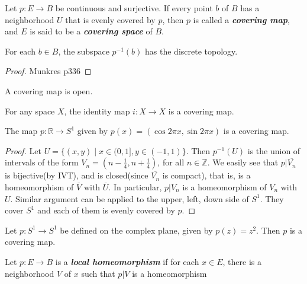 \begin{mydefinition}
Let $p:E\to B$ be continuous and surjective. If every point $b$ of $B$ has a neighborhood $U$ that is evenly covered by $p$, then $p$ is called a \textbf{\emph{covering map}}, and $E$ is said to be a \textbf{\emph{covering space}} of $B$.
\end{mydefinition}

\begin{myproposition}
For each $b\in B$, the subspace $p^{-1}(b)$ has the discrete topology.
\end{myproposition}
\begin{proof}
Munkres p336
\end{proof}

\begin{myproposition}
A covering map is open.
\end{myproposition}

\begin{example}
For any space $X$, the identity map $i:X\to X$ is a covering map.
\end{example}

\begin{mytheorem}
The map $p:\mathbb{R}\to S^1$ given by $p(x)=(\cos 2\pi x,\sin 2\pi x)$ is a covering map.
\end{mytheorem}
\begin{proof}
Let $U=\{(x,y)\mid x\in (0,1],y\in (-1,1)\}$. Then $p^{-1}(U)$ is the union of intervals of the form $V_n=(n-\frac{1}{4},n+\frac{1}{4})$, for all $n\in \mathbb{Z}$. We easily see that $p|\overline{V_n}$ is bijective(by IVT), and is closed(since $\overline{V_n}$ is compact), that is, is a homeomorphism of $\overline{V}$ with $\overline{U}$. In particular, $p|V_n$ is a homeomorphism of $V_n$ with $U$. Similar argument can be applied to the upper, left, down side of $S^1$. They cover $S^1$ and each of them is evenly covered by $p$.
\end{proof}

\begin{example}
Let $p:S^1\to S^1$ be defined on the complex plane, given by $p(z)=z^2$. Then $p$ is a covering map.
\end{example}

\begin{mydefinition}
Let $p:E\to B$ is a \textbf{\emph{local homeomorphism}} if for each $x\in E$, there is a neighborhood $V$ of $x$ such that $p|V$ is a homeomorphism
\end{mydefinition}

